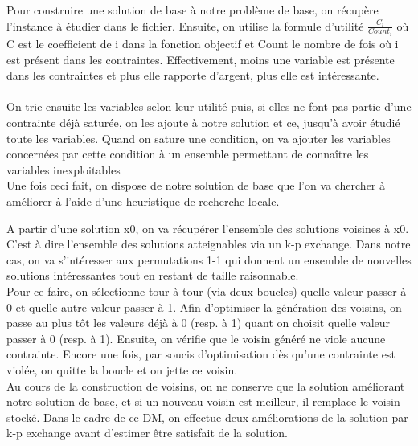 \documentclass[ a4paper,10pt]{article}
\begin{document}
\noindent
Pour construire une solution de base à notre problème de base, on récupère l'instance à étudier dans le fichier. Ensuite, on utilise la formule d'utilité $\frac{C_i}{Count_i}$ où C est le coefficient de i dans la fonction objectif et Count le nombre de fois où i est présent dans les contraintes. Effectivement, moins une variable est présente dans les contraintes et plus elle rapporte d'argent, plus elle est intéressante.
\\ \\ On trie ensuite les variables selon leur utilité puis, si elles ne font pas partie d'une contrainte déjà saturée, on les ajoute à notre solution et ce, jusqu'à avoir étudié toute les variables. Quand on sature une condition, on va ajouter les variables concernées par cette condition à un ensemble permettant de connaître les variables inexploitables
\\ Une fois ceci fait, on dispose de notre solution de base que l'on va chercher à améliorer à l'aide d'une heuristique de recherche locale.


%
%

\vspace{5mm}
\noindent
{}
\vspace{2mm}

\noindent
A partir d'une solution x0, on va récupérer l'ensemble des solutions voisines à x0. C'est à dire l'ensemble des solutions atteignables via un k-p exchange. Dans notre cas, on va s'intéresser aux permutations 1-1 qui donnent un ensemble de nouvelles solutions intéressantes tout en restant de taille raisonnable. \\
Pour ce faire, on sélectionne tour à tour (via deux boucles) quelle valeur passer à 0 et quelle autre valeur passer à 1. Afin d'optimiser la génération des voisins, on passe au plus tôt les valeurs déjà à 0 (resp. à 1) quant on choisit quelle valeur passer à 0 (resp. à 1). Ensuite, on vérifie que le voisin généré ne viole aucune contrainte. Encore une fois, par soucis d'optimisation dès qu'une contrainte est violée, on quitte la boucle et on jette ce voisin. \\
Au cours de la construction de voisins, on ne conserve que la solution améliorant notre solution de base, et si un nouveau voisin est meilleur, il remplace le voisin stocké.
Dans le cadre de ce DM, on effectue deux améliorations de la solution par k-p exchange avant d'estimer être satisfait de la solution.
\end{document}
